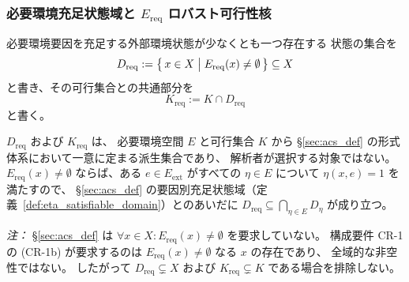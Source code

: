 \subsubsection{必要環境充足状態域と $E_{\mathrm{req}}$ ロバスト可行性核}

\begin{definition}[必要環境充足状態域]
\label{def:req_domain}
必要環境要因を充足する外部環境状態が少なくとも一つ存在する
状態の集合を
\[
  D_{\mathrm{req}}
  :=
  \bigl\{\,x\in X \bigm| E_{\mathrm{req}}(x)\neq\emptyset \,\bigr\}
  \subseteq X
\]
と書き、その可行集合との共通部分を
\[
  K_{\mathrm{req}}
  :=
  K\cap D_{\mathrm{req}}
\]
と書く。

$D_{\mathrm{req}}$ および $K_{\mathrm{req}}$ は、
必要環境空間 $E$ と可行集合 $K$ から
\S\ref{sec:acs_def} の形式体系において一意に定まる派生集合であり、
解析者が選択する対象ではない。
$E_{\mathrm{req}}(x)\neq\emptyset$ ならば、ある $e\in E_{\mathrm{ext}}$ がすべての $\eta\in E$ について $\eta(x,e)=1$ を満たすので、
\S\ref{sec:acs_def} の要因別充足状態域（定義~\ref{def:eta_satisfiable_domain}）とのあいだに
$D_{\mathrm{req}}\subseteq\bigcap_{\eta\in E}D_\eta$ が成り立つ。

\textit{注：}
\S\ref{sec:acs_def} は
$\forall x\in X:E_{\mathrm{req}}(x)\neq\emptyset$ を要求していない。
構成要件 CR-1 の (CR-1b) が要求するのは
$E_{\mathrm{req}}(x)\neq\emptyset$ なる $x$ の存在であり、
全域的な非空性ではない。
したがって $D_{\mathrm{req}}\subsetneq X$ および
$K_{\mathrm{req}}\subsetneq K$ である場合を排除しない。
\end{definition}

